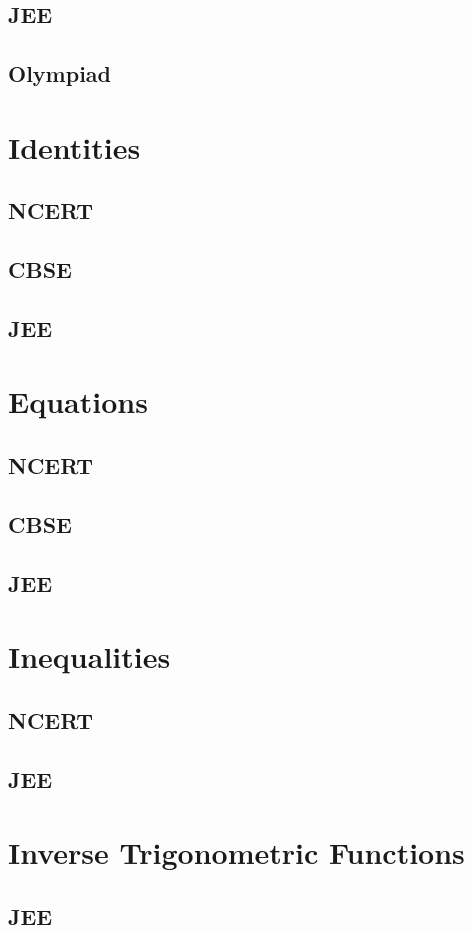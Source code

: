 \documentclass[journal]{IEEEtran}
\begin{document}
\subsection{JEE}

\subsection{Olympiad}

%
\section{Identities}
\subsection{NCERT}
 
\subsection{CBSE}
 
\subsection{JEE}
 
\section{Equations}
\subsection{NCERT}
 
\subsection{CBSE}
 
\subsection{JEE}
 
\section{Inequalities}
\subsection{NCERT}

\subsection{JEE}

\section{Inverse Trigonometric Functions}
\subsection{JEE}
 
%
% 
\end{document}
